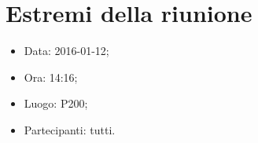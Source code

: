 \documentclass[../Riunione16-01-12.tex]{subfiles}
\begin{document}
\section{Estremi della riunione}
	\begin{itemize}
		\item Data: 2016-01-12;
		\item Ora: 14:16;
		\item Luogo: P200;
		\item Partecipanti: tutti.
	\end{itemize}
\end{document}
